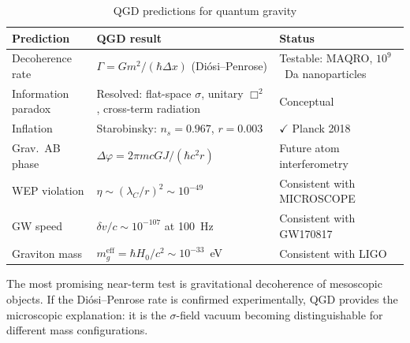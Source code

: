 \documentclass[11pt,a4paper]{article}
\theoremstyle{plain}
\theoremstyle{definition}
\theoremstyle{remark}
\begin{document}
\begin{table}[h]
  \centering
  \renewcommand{\arraystretch}{1.4}
  \caption{QGD predictions for quantum gravity}
  \begin{tabular}{@{}p{3cm}p{5.5cm}p{4cm}@{}}
    \toprule
    Prediction & QGD result & Status \\
    \midrule
    Decoherence rate & $\Gamma = Gm^2/(\hbar\Delta x)$ (Di\'osi--Penrose) & Testable: MAQRO, $10^9$~Da nanoparticles \\
    Information paradox & Resolved: flat-space $\sigma$, unitary $\Box^2$, cross-term radiation & Conceptual \\
    Inflation & Starobinsky: $n_s = 0.967$, $r = 0.003$ & $\checkmark$ Planck 2018 \\
    Grav.\ AB phase & $\Delta\varphi = 2\pi mc GJ/(\hbar c^2 r)$ & Future atom interferometry \\
    WEP violation & $\eta \sim (\lambda_C/r)^2 \sim 10^{-49}$ & Consistent with MICROSCOPE \\
    GW speed & $\delta v/c \sim 10^{-107}$ at 100~Hz & Consistent with GW170817 \\
    Graviton mass & $m_g^{\mathrm{eff}} = \hbar H_0/c^2 \sim 10^{-33}$~eV & Consistent with LIGO \\
    \bottomrule
  \end{tabular}
\end{table}

The most promising near-term test is gravitational decoherence of mesoscopic objects.  If the Di\'osi--Penrose rate is confirmed experimentally, QGD provides the microscopic explanation: it is the $\sigma$-field vacuum becoming distinguishable for different mass configurations.
\end{document}

